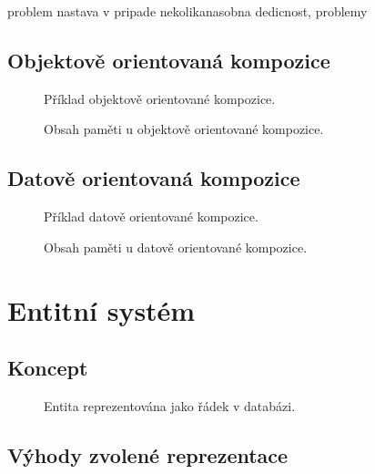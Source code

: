  problem nastava v pripade 
 nekolikanasobna dedicnost, problemy

\subsection{Objektově orientovaná kompozice}
\begin{figure}[H]
	\caption{Příklad objektově orientované kompozice. }
\end{figure}
\begin{figure}[H]
	\caption{Obsah paměti u objektově orientované kompozice. }
\end{figure}
\blind[3]

\subsection{Datově orientovaná kompozice}
\label{Chap:DOC}
\begin{figure}[H]
	\caption{Příklad datově orientované kompozice. }
\end{figure}
\begin{figure}[H]
	\caption{Obsah paměti u datově orientované kompozice. }
\end{figure}
\blind[4]

\section{Entitní systém}
\subsection{Koncept}
\begin{figure}[H]
	\caption{Entita reprezentována jako řádek v databázi. }
\end{figure}
\blind[5]

\subsection{Výhody zvolené reprezentace}
\blind[4]

